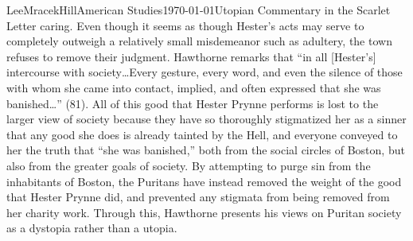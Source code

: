 \documentclass[12pt, letterpaper]{article}
\begin{document}
\begin{mla}{Lee}{Mracek}{Hill}{American Studies}{\today}{Utopian Commentary in the Scarlet Letter}
caring. Even though it seems as though Hester's acts may serve to completely outweigh a relatively small misdemeanor such as adultery, the town refuses to remove their judgment. Hawthorne remarks that ``in all [Hester's] intercourse with society\ldots Every gesture, every word, and even the silence of those with whom she came into contact, implied, and often expressed that she was banished\ldots'' (81). All of this good that Hester Prynne performs is lost to the larger view of society because they have so thoroughly stigmatized her as a sinner that any good she does is already tainted by the Hell, and everyone conveyed to her the truth that ``she was banished,'' both from the social circles of Boston, but also from the greater goals of society. By attempting to purge sin from the inhabitants of Boston, the Puritans have instead removed the weight of the good that Hester Prynne did, and prevented any stigmata from being removed from her charity work. Through this, Hawthorne presents his views on Puritan society as a dystopia rather than a utopia. 
\end{mla}
\end{document}
